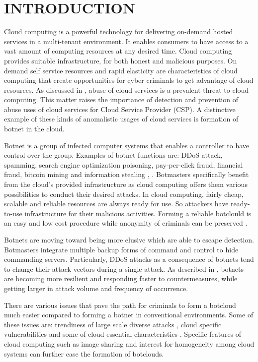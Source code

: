 \documentclass[conference]{IEEEtran}
\begin{document}
\section{INTRODUCTION}
Cloud computing is a powerful technology for delivering on-demand hosted services in a multi-tenant environment. It enables consumers to have access to a vast amount of computing resources at any desired time. Cloud computing provides suitable infrastructure, for both honest and malicious purposes. On demand self service resources and rapid elasticity are characteristics of cloud computing that create opportunities for cyber criminals to get advantage of cloud resources. As discussed in \cite{ref1}, abuse of cloud services is a prevalent threat to cloud computing. This matter raises the importance of detection and prevention of abuse uses of cloud services for Cloud Service Provider (CSP). A distinctive example of these kinds of anomalistic usages of cloud services is formation of botnet in the cloud.

Botnet is a group of infected computer systems that enables a controller to have control over the group. Examples of botnet functions are: DDoS attack, spamming, search engine optimization poisoning, pay-per-click fraud, financial fraud, bitcoin mining and information stealing \cite{ref22}, \cite{ref34}. Botmasters specifically benefit from the cloud's provided infrastructure as cloud computing offers them various possibilities to conduct their desired attacks. In cloud computing, fairly cheap, scalable and reliable resources are always ready for use. So attackers have ready-to-use infrastructure for their malicious activities. Forming a reliable botclould is an easy and low cost procedure while anonymity of criminals can be preserved \cite{ref42}. 

Botnets are moving toward being more elusive which are able to escape detection. Botmasters integrate multiple backup forms of command and control to hide commanding servers. Particularly, DDoS attacks as a consequence of botnets tend to change their attack vectors during a single attack. As described in \cite{ref14}, botnets are becoming more resilient and responding faster to countermeasures, while getting larger in attack volume and frequency of occurrence\cite{ref16}. 

There are various issues that pave the path for criminals to form a botcloud much easier compared to forming a botnet in conventional environments. Some of these issues are: trendiness of large scale diverse attacks \cite{ref36}, cloud specific vulnerabilities \cite{ref9} and some of cloud essential characteristics \cite{ref40}. Specific features of cloud computing such as image sharing and interest for homogeneity among cloud systems can further ease the formation of botclouds.    
\end{document}
